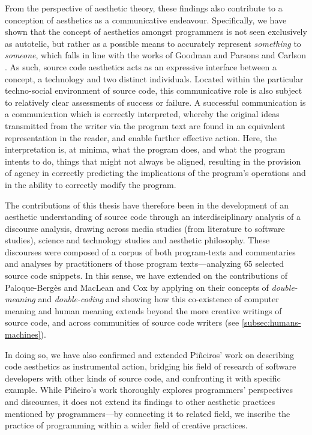 From the perspective of aesthetic theory, these findings also contribute to a conception of aesthetics as a communicative endeavour. Specifically, we have shown that the concept of aesthetics amongst programmers is not seen exclusively as autotelic, but rather as a possible means to accurately represent \emph{something} to \emph{someone}, which falls in line with the works of Goodman and Parsons and Carlson \citep{goodman_languages_1976,parsons_functional_2012}. As such, source code aesthetics acts as an expressive interface between a concept, a technology and two distinct individuals. Located within the particular techno-social environment of source code, this communicative role is also subject to relatively clear assessments of success or failure. A successful communication is a communication which is correctly interpreted, whereby the original ideas transmitted from the writer via the program text are found in an equivalent representation in the reader, and enable further effective action. Here, the interpretation is, at minima, what the program does, and what the program intents to do, things that might not always be aligned, resulting in the provision of agency in correctly predicting the implications of the program's operations and in the ability to correctly modify the program.

The contributions of this thesis have therefore been in the development of an aesthetic understanding of source code through an interdisciplinary analysis of a discourse analysis, drawing across media studies (from literature to software studies), science and technology studies and aesthetic philosophy. These discourses were composed of a corpus of both program-texts and commentaries and analyses by practitioners of those program texts—analyzing 65  selected source code snippets. In this sense, we have extended on the contributions of Paloque-Bergès and MacLean and Cox by applying on their concepts of \emph{double-meaning}  and \emph{double-coding} and showing how this co-existence of computer meaning and human meaning extends beyond the more creative writings of source code, and across communities of source code writers (see \ref{subsec:humans-machines}).

In doing so, we have also confirmed and extended Piñeiros' work on describing code aesthetics as instrumental action, bridging his field of research of software developers with other kinds of source code, and confronting it with specific example. While Piñeiro's work thoroughly explores programmers' perspectives and discourses, it does not extend its findings to other aesthetic practices mentioned by programmers—by connecting it to related field, we inscribe the practice of programming within a wider field of creative practices.

